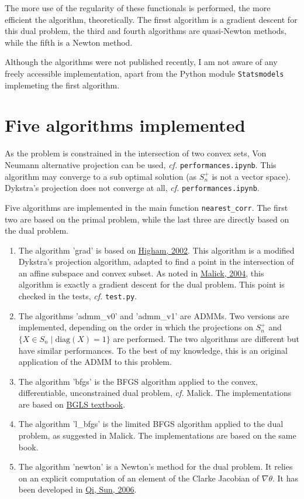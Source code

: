 \documentclass{article}
\begin{document}
\medskip

The more use of the regularity of these functionals is performed, the more efficient the algorithm, theoretically. The firsst algorithm is a gradient descent for this dual problem, the third and fourth algorithms are quasi-Newton methods, while the fifth is a Newton method.

\medskip

Although the algorithms were not published recently, I am not aware of any freely accessible implementation,
apart from the Python module \texttt{Statsmodels} implemeting the first algorithm.

\section{Five algorithms implemented}

As the problem is constrained in the intersection of two convex sets, Von Neumann alternative projection can be used, \emph{cf.} \texttt{performances.ipynb}. This algorithm may converge to a sub optimal solution (as $S_n^+$ is not a vector space). Dykstra's projection does not converge at all, \emph{cf.} \texttt{performances.ipynb}.

\medskip

Five algorithms are implemented in the main function \texttt{nearest\_corr}. The first two are based on the primal problem, while the last three are directly based on the dual problem.
\begin{enumerate}
\item The algorithm 'grad' is based on \href{https://www.maths.manchester.ac.uk/~higham/narep/narep369.pdf}{Higham, 2002}.
This algorithm is a modified Dykstra's projection algorithm, adapted to find a point in the intersection of an affine subspace and convex subset. As noted in \href{https://hal.inria.fr/inria-00072409v2/document}{Malick, 2004}, this algorithm is exactly a gradient descent for the dual problem. This point is checked in the tests, \emph{cf.} \texttt{test.py}.
\item The algorithms 'admm\_v0' and 'admm\_v1' are ADMMs. Two versions are implemented, depending on the order in which the projections on $S_n^+$ and $\{X\in S_n \mid \mathrm{diag}(X) = 1\}$ are performed. The two algorithms are different but have similar performances. To the best of my knowledge, this is an original application of the ADMM to this problem.
\item The algorithm 'bfgs' is the BFGS algorithm applied to the convex, differentiable, unconstrained dual problem, \emph{cf.} Malick. The implementations are based on \href{https://link.springer.com/book/10.1007/978-3-540-35447-5}{BGLS textbook}.
\item The algorithm 'l\_bfgs' is the limited BFGS algorithm applied to the dual problem, as suggested in Malick. The implementations are based on the same book.
\item The algorithm 'newton' is a Newton's method for the dual problem. It relies on an explicit computation of an element of the Clarke Jacobian of $\nabla \theta$. It has been developed in \href{http://www.personal.soton.ac.uk/hdqi/REPORTS/simax_06.pdf}{Qi, Sun, 2006}.
\end{enumerate}
\end{document}
